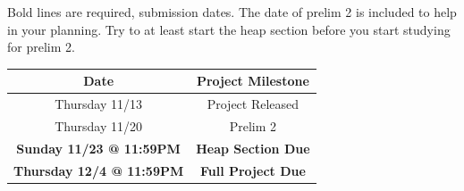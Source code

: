 \documentclass[11pt]{article}
\begin{document}
Bold lines are required, submission dates. The date of prelim 2 is included to help in your planning. Try to at least start the heap section before you start studying for prelim 2.\\

\begin{center}
\begin{Large}
\begin{tabular}{| c | c |}
\hline
Date & Project Milestone\\
\hline
Thursday 11/13 & Project Released\\
Thursday 11/20 & Prelim 2\\
\textbf{Sunday 11/23 @ 11:59PM} & \textbf{Heap Section Due}\\
\textbf{Thursday 12/4 @ 11:59PM} & \textbf{Full Project Due}\\
\hline
\end{tabular}
\end{Large}
\end{center}
\end{document}
